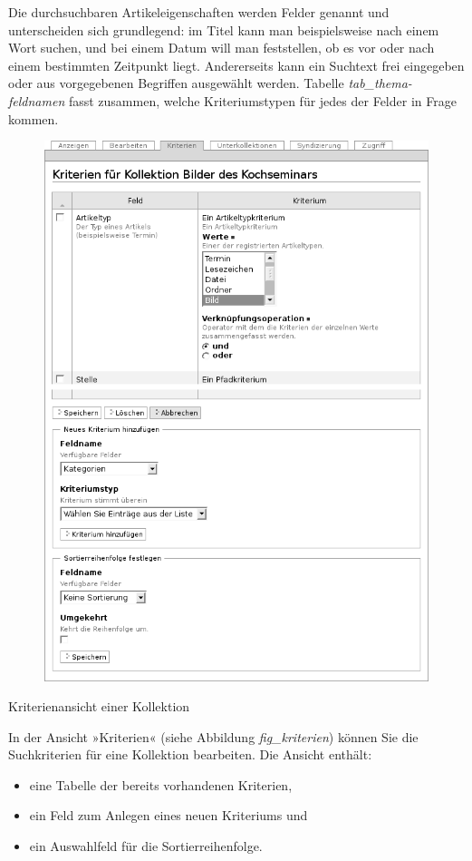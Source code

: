 \documentclass[a4paper,12pt,ngerman]{manual}
\begin{document}
Die durchsuchbaren Artikeleigenschaften werden Felder genannt und
unterscheiden sich grundlegend: im Titel kann man beispielsweise nach einem
Wort suchen, und bei einem Datum will man feststellen, ob es vor oder nach
einem bestimmten Zeitpunkt liegt. Andererseits kann ein Suchtext frei
eingegeben oder aus vorgegebenen Begriffen ausgewählt werden.
Tabelle \emph{tab\_thema-feldnamen} fasst zusammen, welche
Kriteriumstypen für jedes der Felder in Frage kommen.


\hypertarget{fig-kriterien}{}\begin{figure}[htbp]
\centering

\includegraphics{kriterien.png}
\end{figure}

Kriterienansicht einer Kollektion

In der Ansicht »Kriterien« (siehe Abbildung \emph{fig\_kriterien})
können Sie die Suchkriterien für eine Kollektion bearbeiten. Die Ansicht
enthält:
\begin{itemize}
\item {} 
eine Tabelle der bereits vorhandenen Kriterien,

\item {} 
ein Feld zum Anlegen eines neuen Kriteriums und

\item {} 
ein Auswahlfeld für die Sortierreihenfolge.

\end{itemize}
\end{document}

